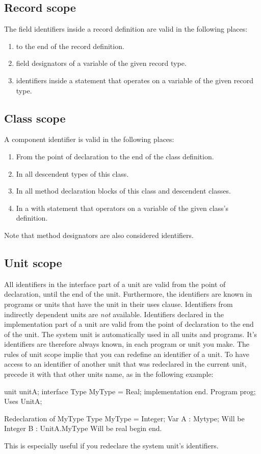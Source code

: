 \documentclass{report}
\begin{document}
\subsection{Record scope}
The field identifiers inside a record definition are valid in the following
places:
\begin{enumerate}
\item to the end of the record definition.
\item field designators of a variable of the given record type.
\item identifiers inside a  statement that operates on a variable
of the given record type.
\end{enumerate}
\subsection{Class scope}
A component identifier is valid in the following places:
\begin{enumerate}
\item From the point of declaration to the end of the class definition.
\item In all descendent types of this class.
\item In all method declaration blocks of this class and descendent classes.
\item In a with statement that operators on a variable of the given class's
definition.
\end{enumerate}
Note that method designators are also considered identifiers.
\subsection{Unit scope}
All identifiers in the interface part of a unit are valid from the point of
declaration, until the end of the unit. Furthermore, the identifiers are
known in programs or units that have the unit in their uses clause.
Identifiers from indirectly dependent units are {\em not} available.
Identifiers declared in the implementation part of a unit are valid from the
point of declaration to the end of the unit.
The system unit is automatically used in all units and programs. 
It's identifiers are therefore always known, in each program or unit 
you make.
The rules of unit scope implie that you can redefine an identifier of a
unit. To have access to an identifier of another unit that was redeclared in 
the current unit, precede it with that other units name, as in the following
example:
\begin{listing}
unit unitA;
interface
Type
  MyType = Real;
implementation
end.
Program prog;
Uses UnitA;
 
{ Redeclaration of MyType}
Type MyType = Integer;
Var A : Mytype;      { Will be Integer }
    B : UnitA.MyType { Will be real }
begin
end.
\end{listing}
This is especially useful if you redeclare the system unit's identifiers.
\end{document}
